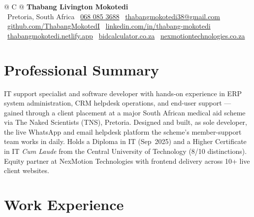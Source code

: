 \documentclass[a4paper,10.5pt]{article}
\newcommand{\icoPin}{{\color{accent}\faMapMarker*}}
\newcommand{\icoPhone}{{\color{accent}\faPhone}}
\newcommand{\icoMail}{{\color{accent}\faEnvelope[regular]}}
\newcommand{\icoGlobe}{{\color{accent}\faGlobe}}
\newcommand{\icoLink}{{\color{accent}\faLink}}
\newcommand{\cupicon}[1]{{\color{accent}\cupertino\symbol{"#1}}}
\newcommand{\icoPin}{\cupicon{F455}}   %
\newcommand{\icoPhone}{\cupicon{F4B8}} %
\newcommand{\icoMail}{\cupicon{F422}}  %
\newcommand{\icoGlobe}{\cupicon{F68D}} %
\newcommand{\icoLink}{\cupicon{F6E5}}  %
\newcommand{\icoGithub}{{\color{accent}\faGithub}}
\newcommand{\icoLinkedin}{{\color{accent}\faLinkedin}}
\begin{document}
\pagestyle{empty}

\begin{tabularx}{\linewidth}{@{} C @{}}
  {\Huge\textbf{Thabang Livington Mokotedi}} \\[7pt]
  \icoPin\ Pretoria, South Africa \quad
  \icoPhone\ \href{tel:+27680853688}{068 085 3688} \quad
  \icoMail\ \href{mailto:thabangmokotedi38@gmail.com}{thabangmokotedi38@gmail.com} \\[4pt]
  \icoGithub\ \href{https://github.com/ThabangMokotedI}{github.com/ThabangMokotedI} \quad
  \icoLinkedin\ \href{https://www.linkedin.com/in/thabang-mokotedi/}{linkedin.com/in/thabang-mokotedi} \\[4pt]
  \icoGlobe\ \href{https://thabangmokotedi.netlify.app}{thabangmokotedi.netlify.app} \quad
  \icoLink\ \href{https://bidcalculator.co.za}{bidcalculator.co.za} \quad
  \icoLink\ \href{https://nexmotiontechnologies.co.za/projects.html}{nexmotiontechnologies.co.za}
\end{tabularx}

\section{Professional Summary}

\vspace{5pt}
IT support specialist and software developer with hands-on experience in ERP system administration, CRM helpdesk operations, and end-user support — gained through a client placement at a major South African medical aid scheme via The Naked Scientists (TNS), Pretoria. Designed and built, as sole developer, the live WhatsApp and email helpdesk platform the scheme’s member-support team works in daily. Holds a Diploma in IT (Sep~2025) and a Higher Certificate in IT \textit{Cum Laude} from the Central University of Technology (8/10 distinctions). Equity partner at NexMotion Technologies with frontend delivery across 10+ live client websites.

\section{Work Experience}
\end{document}
